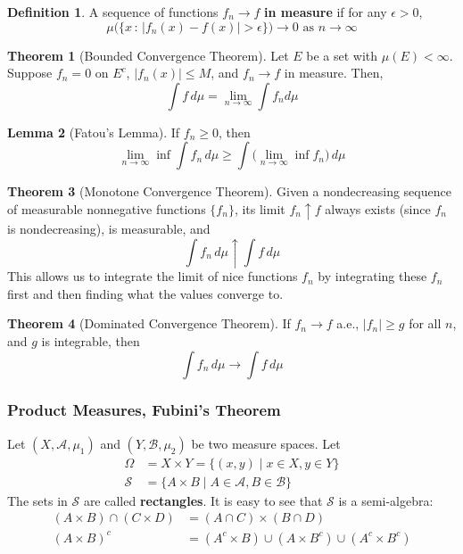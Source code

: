 \documentclass{article}
\theoremstyle{definition}
\newtheorem{theorem}{Theorem}[section]
\newtheorem{lemma}[theorem]{Lemma}
\theoremstyle{remark}
\theoremstyle{definition}
\newtheorem{definition}{Definition}[section]
\begin{document}
\begin{definition}
A sequence of functions $f_n \rightarrow f$ \textbf{in measure} if for any $\epsilon > 0$, 
\[\mu\big( \{x \,:\, |f_n (x) - f(x)| > \epsilon \}\big) \rightarrow 0 \text{ as } n \rightarrow \infty\]
\end{definition}

\begin{theorem}[Bounded Convergence Theorem]
Let $E$ be a set with $\mu(E) < \infty$. Suppose $f_n = 0$ on $E^c$, $|f_n (x)| \leq M$, and $f_n \rightarrow f$ in measure. Then, 
\[\int f \,d\mu = \lim_{n \rightarrow \infty} \int f_n d\mu\]
\end{theorem}

\begin{lemma}[Fatou's Lemma]
If $f_n \geq 0$, then
\[\lim_{n \rightarrow \infty} \inf \int f_n \,d\mu \geq \int \Big( \lim_{n \rightarrow \infty} \inf f_n \Big) \,d\mu\]
\end{lemma}

\begin{theorem}[Monotone Convergence Theorem]
Given a nondecreasing sequence of measurable nonnegative functions $\{f_n\}$, its limit $f_n \uparrow f$ always exists (since $f_n$ is nondecreasing), is measurable, and 
\[\int f_n \, d\mu \uparrow \int f \, d\mu\]
This allows us to integrate the limit of nice functions $f_n$ by integrating these $f_n$ first and then finding what the values converge to. 
\end{theorem}

\begin{theorem}[Dominated Convergence Theorem]
If $f_n \rightarrow f$ a.e., $|f_n| \geq g$ for all $n$, and $g$ is integrable, then 
\[\int f_n \,d\mu \rightarrow \int f\, d\mu\]
\end{theorem}

\subsubsection{Product Measures, Fubini's Theorem}

Let $(X, \mathcal{A}, \mu_1)$ and $(Y, \mathcal{B}, \mu_2)$ be two measure spaces. Let 
\begin{align*}
    \Omega & = X \times Y = \{(x, y) \mid x \in X, y \in Y\} \\
    \mathcal{S} & = \{A \times B \mid A \in \mathcal{A}, B \in \mathcal{B}\}
\end{align*}
The sets in $\mathcal{S}$ are called \textbf{rectangles}. It is easy to see that $\mathcal{S}$ is a semi-algebra: 
\begin{align*}
    (A \times B) \cap (C \times D) & = (A \cap C) \times (B \cap D) \\
    (A \times B)^c & = (A^c \times B) \cup (A \times B^c) \cup (A^c \times B^c) 
\end{align*}
\end{document}
